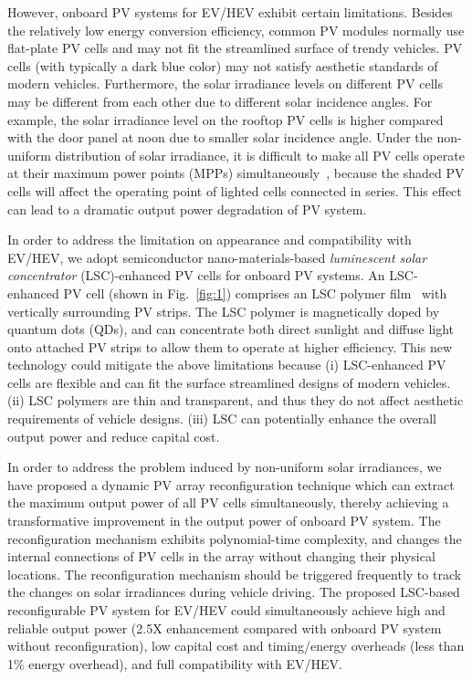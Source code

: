 However, onboard PV systems for EV/HEV exhibit certain limitations. Besides the relatively low energy conversion efficiency, common PV modules normally use flat-plate PV cells and may not fit the streamlined surface of trendy vehicles. PV cells (with typically a dark blue color) may not satisfy aesthetic standards of modern vehicles. Furthermore, the solar irradiance levels on different PV cells may be different from each other due to different solar incidence angles. For example, the solar irradiance level on the rooftop PV cells is higher compared with the door panel at noon due to smaller solar incidence angle. Under the non-uniform distribution of solar irradiance, it is difficult to make all PV cells operate at their maximum power points (MPPs) simultaneously~\cite{patel2008maximum}, because the shaded PV cells will affect the operating point of lighted cells connected in series. This effect can lead to a dramatic output power degradation of PV system.


In order to address the limitation on appearance and compatibility with EV/HEV, we adopt semiconductor nano-materials-based \emph{ luminescent solar concentrator} (LSC)-enhanced PV cells for onboard PV systems. An LSC-enhanced PV cell (shown in Fig.~\ref{fig:1}) comprises an LSC polymer film~\cite{meinardi2014large} with vertically surrounding PV strips. The LSC polymer is magnetically doped by quantum dots (QDs), and can concentrate both direct sunlight and diffuse light onto attached PV strips to allow them to operate at higher efficiency. This new technology could mitigate the above limitations because (i) LSC-enhanced PV cells are flexible and can fit the surface streamlined designs of modern vehicles. (ii) LSC polymers are thin and transparent, and thus they do not affect aesthetic requirements of vehicle designs. (iii) LSC can potentially enhance the overall output power and reduce capital cost.

In order to address the problem induced by non-uniform solar irradiances, we have proposed a dynamic PV array reconfiguration technique which can extract the maximum output power of all PV cells simultaneously, thereby achieving a transformative improvement in the output power of onboard PV system. The reconfiguration mechanism exhibits polynomial-time complexity, and changes the internal connections of PV cells in the array without changing their physical locations. The reconfiguration mechanism should be triggered frequently to track the changes on solar irradiances during vehicle driving.
The proposed LSC-based reconfigurable PV system for EV/HEV could simultaneously achieve high and reliable output power (2.5X enhancement compared with onboard PV system without reconfiguration), low capital cost and timing/energy overheads (less than 1\% energy overhead), and full compatibility with EV/HEV.





